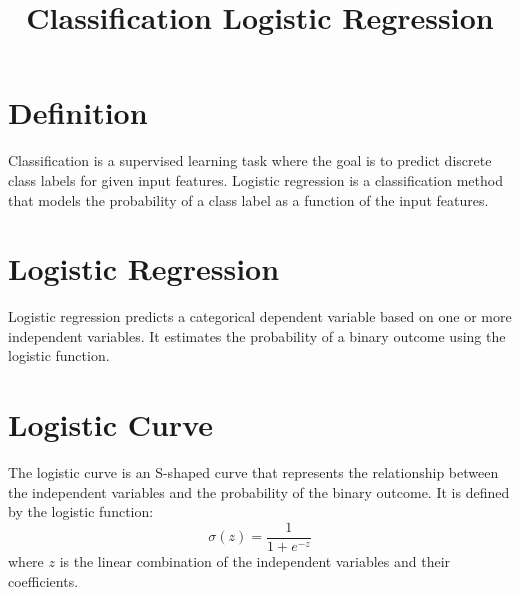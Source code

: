 \documentclass[conference]{IEEEtran}
\title{Classification Logistic Regression}
\author{
\IEEEauthorblockN{Luis Mendez}
}
\begin{document}
\maketitle

\section*{Definition}
Classification is a supervised learning task where the goal is to predict discrete class labels for given input features. Logistic regression is a classification method that models the probability of a class label as a function of the input features.

\section*{Logistic Regression}
Logistic regression predicts a categorical dependent variable based on one or more independent variables. It estimates the probability of a binary outcome using the logistic function.


\section*{Logistic Curve}
The logistic curve is an S-shaped curve that represents the relationship between the independent variables and the probability of the binary outcome. It is defined by the logistic function:
\[
\sigma(z) = \frac{1}{1 + e^{-z}}
\]
where $z$ is the linear combination of the independent variables and their coefficients.
\end{document}

